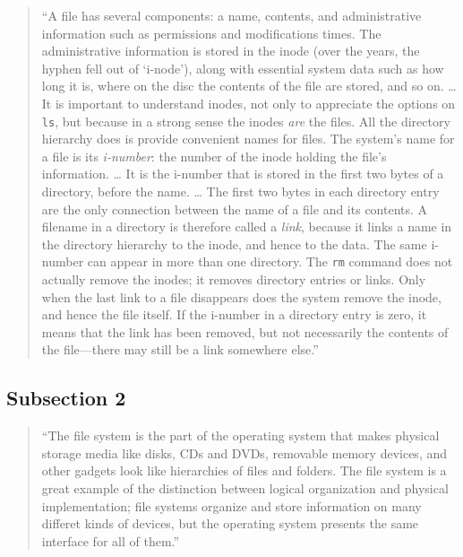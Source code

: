 \documentclass[]{tufte-book}
\begin{document}
\begin{quote}
``A file has several components: a name, contents, and administrative information such as
permissions and modifications times. The administrative information is stored in the inode
(over the years, the hyphen fell out of `i-node'), along with essential system data such as
how long it is, where on the disc the contents of the file are stored, and so on. \ldots{}
It is important to understand inodes, not only to appreciate the options on \texttt{ls}, but because
in a strong sense the inodes \emph{are} the files. All the directory hierarchy does is provide
convenient names for files. The system's name for a file is its \emph{i-number}: the number of the
inode holding the file's information. \ldots{} It is the i-number that is stored in the first two bytes
of a directory, before the name. \ldots{}
The first two bytes in each directory entry are the only connection between the name of a file and its
contents. A filename in a directory is therefore called a \emph{link}, because it links a name in the
directory hierarchy to the inode, and hence to the data. The same i-number can appear in more than
one directory. The \texttt{rm} command does not actually remove the inodes; it removes directory entries
or links. Only when the last link to a file disappears does the system remove the inode, and hence
the file itself. If the i-number in a directory entry is zero, it means that the link has been
removed, but not necessarily the contents of the file---there may still be a link somewhere else.'' \citep{kernighan1984unix}
\end{quote}

\hypertarget{subsection-2}{%
\subsection{Subsection 2}\label{subsection-2}}

\begin{quote}
``The file system is the part of the operating system that makes physical storage media
like disks, CDs and DVDs, removable memory devices, and other gadgets look like hierarchies
of files and folders. The file system is a great example of the distinction between
logical organization and physical implementation; file systems organize and store
information on many differet kinds of devices, but the operating system presents the
same interface for all of them.'' \citep{kernighan2011d}
\end{quote}
\end{document}
